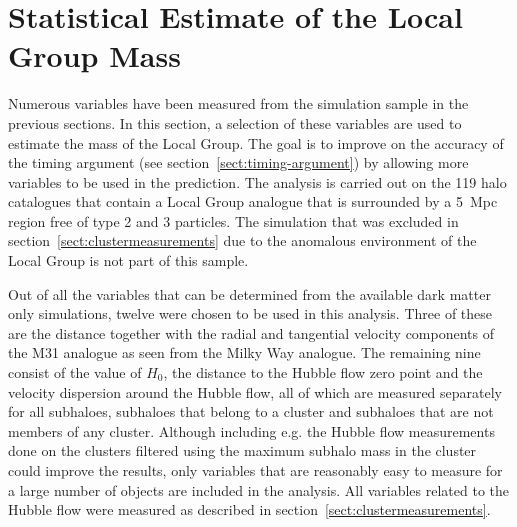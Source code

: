 \documentclass[english, twoside]{HYgradu}
\begin{document}



\section{Statistical Estimate of the Local Group Mass}\label{sect:statistical_estimate}
Numerous variables have been measured from the simulation sample in the previous sections. In this section, a selection of these variables are used to estimate the mass of the Local Group. The goal is to improve on the accuracy of the timing argument (see section~\ref{sect:timing-argument}) by allowing more variables to be used in the prediction. The analysis is carried out on the 119 halo catalogues that contain a Local Group analogue that is surrounded by a 5~Mpc region free of type 2 and 3 particles. The simulation that was excluded in section~\ref{sect:clustermeasurements} due to the anomalous environment of the Local Group is not part of this sample.

Out of all the variables that can be determined from the available dark matter only simulations, twelve were chosen to be used in this analysis. Three of these are the distance together with the radial and tangential velocity components of the M31 analogue as seen from the Milky Way analogue. The remaining nine consist of the value of $H_0$, the distance to the Hubble flow zero point and the velocity dispersion around the Hubble flow, all of which are measured separately for all subhaloes, subhaloes that belong to a cluster and subhaloes that are not members of any cluster. Although including e.g. the Hubble flow measurements done on the clusters filtered using the maximum subhalo mass in the cluster could improve the results, only variables that are reasonably easy to measure for a large number of objects are included in the analysis. All variables related to the Hubble flow were measured as described in section~\ref{sect:clustermeasurements}.
\end{document}
